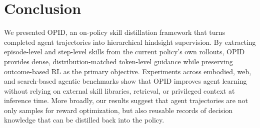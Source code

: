 \section{Conclusion}
We presented OPID, an on-policy skill distillation framework that turns completed agent trajectories into hierarchical hindsight supervision. By extracting episode-level and step-level skills from the current policy's own rollouts, OPID provides dense, distribution-matched token-level guidance while preserving outcome-based RL as the primary objective. Experiments across embodied, web, and search-based agentic benchmarks show that OPID improves agent learning without relying on external skill libraries, retrieval, or privileged context at inference time. More broadly, our results suggest that agent trajectories are not only samples for reward optimization, but also reusable records of decision knowledge that can be distilled back into the policy.